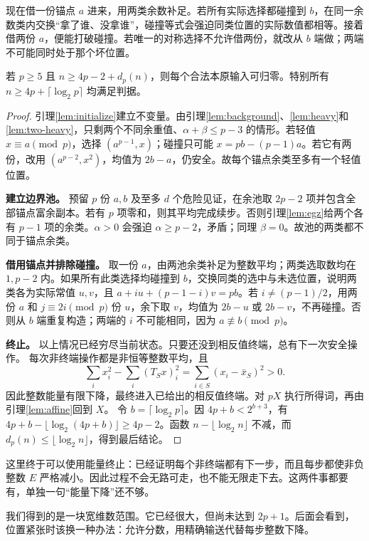 现在借一份锚点 $a$ 进来，用两类余数补足。若所有实际选择都碰撞到 $b$，在同一余数类内交换“拿了谁、没拿谁”，碰撞等式会强迫同类位置的实际数值都相等。接着借两份 $a$，便能打破碰撞。若唯一的对称选择不允许借两份，就改从 $b$ 端做；两端不可能同时处于那个坏位置。
\begin{lemma}[整数下降覆盖的维数范围]\label{lem:integer-range}
若 $p\ge5$ 且 $n\ge4p-2+d_p(n)$，则每个合法本原输入可归零。特别所有 $n\ge4p+\lceil\log_2p\rceil$ 均满足判据。
\end{lemma}
\begin{proof}
引理\ref{lem:initialize}建立不变量。由引理\ref{lem:background}、\ref{lem:heavy}和\ref{lem:two-heavy}，只剩两个不同余重值、$\alpha+\beta\le p-3$ 的情形。若轻值 $x\equiv a\pmod p$，选择 $(a^{p-1},x)$；碰撞只可能 $x=pb-(p-1)a$。若它有两份，改用 $(a^{p-2},x^2)$，均值为 $2b-a$，仍安全。故每个锚点余类至多有一个轻值位置。
\par\noindent\textbf{建立边界池。}
预留 $p$ 份 $a,b$ 及至多 $d$ 个危险见证，在余池取 $2p-2$ 项并包含全部锚点富余副本。若有 $p$ 项零和，则其平均完成续步。否则引理\ref{lem:egz}给两个各有 $p-1$ 项的余类。$\alpha>0$ 会强迫 $\alpha\ge p-2$，矛盾；同理 $\beta=0$。故池的两类都不同于锚点余类。
\par\noindent\textbf{借用锚点并排除碰撞。}
取一份 $a$，由两池余类补足为整数平均；两类选取数均在 $1,p-2$ 内。如果所有此类选择均碰撞到 $b$，交换同类的选中与未选位置，说明两类各为实际常值 $u,v$，且 $a+iu+(p-1-i)v=pb$。若 $i\ne(p-1)/2$，用两份 $a$ 和 $j\equiv2i\pmod p$ 份 $u$，余下取 $v$，均值为 $2b-u$ 或 $2b-v$，不再碰撞。否则从 $b$ 端重复构造；两端的 $i$ 不可能相同，因为 $a\not\equiv b\pmod p$。
\par\noindent\textbf{终止。}
以上情况已经穷尽当前状态。只要还没到相反值终端，总有下一次安全操作。
每次非终端操作都是非恒等整数平均，且
\[\sum_i x_i^2-\sum_i(T_Sx)_i^2=\sum_{i\in S}(x_i-\bar x_S)^2>0.
\]
因此整数能量有限下降，最终进入已给出的相反值终端。对 $pX$ 执行所得词，再由引理\ref{lem:affine}回到 $X$。
令 $b=\lceil\log_2p\rceil$。因 $4p+b<2^{b+3}$，有 $4p+b-\lfloor\log_2(4p+b)\rfloor\ge4p-2$。函数 $n-\lfloor\log_2n\rfloor$ 不减，而 $d_p(n)\le\lfloor\log_2n\rfloor$，得到最后结论。
\end{proof}

这里终于可以使用能量终止：已经证明每个非终端都有下一步，而且每步都使非负整数 $E$ 严格减小。因此过程不会无路可走，也不能无限走下去。这两件事都要有，单独一句“能量下降”还不够。

我们得到的是一块宽维数范围。它已经很大，但尚未达到 $2p+1$。后面会看到，位置紧张时该换一种办法：允许分数，用精确输送代替每步整数下降。
